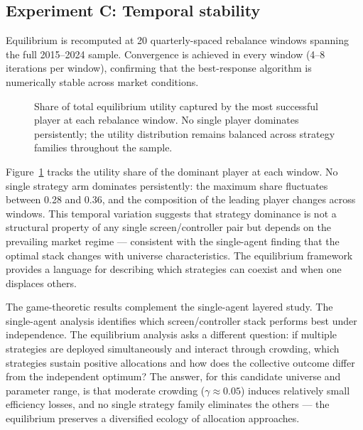 \documentclass[journal,10pt]{IEEEtran}
\begin{document}
\subsection{Experiment C: Temporal stability}
Equilibrium is recomputed at 20 quarterly-spaced rebalance windows spanning the full 2015--2024 sample. Convergence is achieved in every window (4--8 iterations per window), confirming that the best-response algorithm is numerically stable across market conditions.

\begin{figure}[!t]
\centering
{}
\caption{Share of total equilibrium utility captured by the most successful player at each rebalance window. No single player dominates persistently; the utility distribution remains balanced across strategy families throughout the sample.}
\label{fig:temporal_stability}
\end{figure}

Figure~\ref{fig:temporal_stability} tracks the utility share of the dominant player at each window. No single strategy arm dominates persistently: the maximum share fluctuates between 0.28 and 0.36, and the composition of the leading player changes across windows. This temporal variation suggests that strategy dominance is not a structural property of any single screen/controller pair but depends on the prevailing market regime — consistent with the single-agent finding that the optimal stack changes with universe characteristics. The equilibrium framework provides a language for describing which strategies can coexist and when one displaces others.

The game-theoretic results complement the single-agent layered study. The single-agent analysis identifies which screen/controller stack performs best under independence. The equilibrium analysis asks a different question: if multiple strategies are deployed simultaneously and interact through crowding, which strategies sustain positive allocations and how does the collective outcome differ from the independent optimum? The answer, for this candidate universe and parameter range, is that moderate crowding ($\gamma\approx0.05$) induces relatively small efficiency losses, and no single strategy family eliminates the others — the equilibrium preserves a diversified ecology of allocation approaches.
\end{document}
